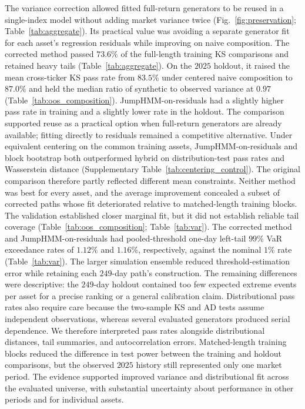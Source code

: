 The variance correction allowed fitted full-return generators to be
reused in a single-index model without adding market variance twice
(Fig.~\ref{fig:preservation}; Table~\ref{tab:aggregate}).
Its practical value was avoiding a separate generator fit for each
asset's regression residuals while improving on naive composition. The corrected method passed $73.6\%$ of the full-length training
KS comparisons and retained heavy tails (Table~\ref{tab:aggregate}).
On the $2025$ holdout, it raised the mean cross-ticker KS pass rate
from $83.5\%$ under centered naive composition to $87.0\%$ and held
the median ratio of synthetic to observed variance at $0.97$
(Table~\ref{tab:oos_composition}). JumpHMM-on-residuals had a slightly
higher pass rate in training and a slightly lower rate in the holdout.
The comparison supported reuse as a practical option when full-return
generators are already available; fitting directly to residuals
remained a competitive alternative. Under equivalent centering on the
common training assets, JumpHMM-on-residuals and block bootstrap both
outperformed hybrid on distribution-test pass rates and Wasserstein
distance (Supplementary Table~\ref{tab:centering_control}). The original comparison
therefore partly reflected different mean constraints. Neither method
was best for every asset, and the average improvement concealed a subset of corrected
paths whose fit deteriorated relative to matched-length training
blocks.
The validation established closer marginal fit, but it did not establish
reliable tail coverage (Table~\ref{tab:oos_composition};
Table~\ref{tab:var}). The corrected method and JumpHMM-on-residuals
had pooled-threshold one-day left-tail $99\%$ VaR exceedance rates
of $1.12\%$ and $1.16\%$, respectively, against the nominal $1\%$
rate (Table~\ref{tab:var}). The larger simulation ensemble reduced
threshold-estimation error while retaining each $249$-day path's
construction. The remaining differences were descriptive: the
$249$-day holdout contained too few expected extreme events per
asset for a precise ranking or a general calibration claim. Distributional pass rates also require care because
the two-sample KS and AD tests assume independent observations,
whereas several evaluated generators produced serial dependence. We
therefore interpreted pass rates alongside distributional distances,
tail summaries, and autocorrelation errors. Matched-length training
blocks reduced the difference in test power between the training and
holdout comparisons, but the observed $2025$ history still represented
only one market period. The evidence supported improved variance and
distributional fit across the evaluated universe, with substantial
uncertainty about performance in other periods and for individual
assets.

